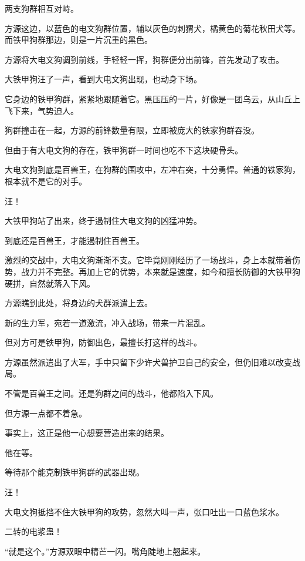 
\begin{this_body}

两支狗群相互对峙。

方源这边，以蓝色的电文狗群位置，辅以灰色的刺猬犬，橘黄色的菊花秋田犬等。而铁甲狗群那边，则是一片沉重的黑色。

方源将大电文狗调到前线，手轻轻一挥，狗群便分出前锋，首先发动了攻击。

大铁甲狗汪了一声，看到大电文狗出现，也动身下场。

它身边的铁甲狗群，紧紧地跟随着它。黑压压的一片，好像是一团乌云，从山丘上飞下来，气势迫人。

狗群撞击在一起，方源的前锋数量有限，立即被庞大的铁家狗群吞没。

但由于有大电文狗的存在，铁甲狗群一时间也吃不下这块硬骨头。

大电文狗到底是百兽王，在狗群的围攻中，左冲右突，十分勇悍。普通的铁家狗，根本就不是它的对手。

汪！

大铁甲狗站了出来，终于遏制住大电文狗的凶猛冲势。

到底还是百兽王，才能遏制住百兽王。

激烈的交战中，大电文狗渐渐不支。它毕竟刚刚经历了一场战斗，身上本就带着伤势，战力并不完整。再加上它的优势，本来就是速度，如今和擅长防御的大铁甲狗硬拼，自然就落入下风。

方源瞧到此处，将身边的犬群派遣上去。

新的生力军，宛若一道激流，冲入战场，带来一片混乱。

但对方可是铁甲狗，防御出色，最擅长打这样的战斗。

方源虽然派遣出了大军，手中只留下少许犬兽护卫自己的安全，但仍旧难以改变战局。

不管是百兽王之间。还是狗群之间的战斗，他都陷入下风。

但方源一点都不着急。

事实上，这正是他一心想要营造出来的结果。

他在等。

等待那个能克制铁甲狗群的武器出现。

汪！

大电文狗抵挡不住大铁甲狗的攻势，忽然大叫一声，张口吐出一口蓝色浆水。

二转的电浆蛊！

“就是这个。”方源双眼中精芒一闪。嘴角陡地上翘起来。


\end{this_body}
